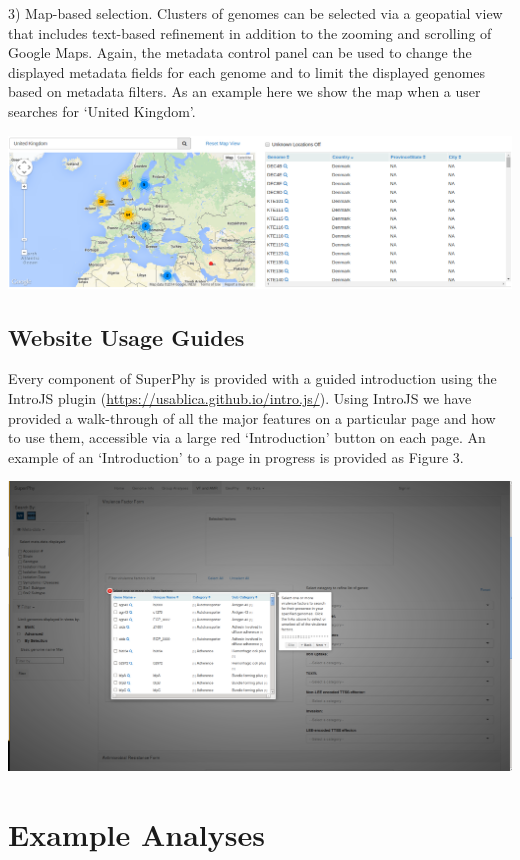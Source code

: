 \documentclass[doublespacing, linenumbers]{bmcart}
\begin{document}
 3) Map-based selection. Clusters of genomes can be selected via a geopatial view that includes text-based refinement in addition to the zooming and scrolling of Google Maps. Again, the metadata control panel can be used to change the displayed metadata fields for each genome and to limit the displayed genomes based on metadata filters. As an example here we show the map when a user searches for `United Kingdom'.

 \includegraphics[width=\textwidth]{images/uk-map.png}

\subsection{Website Usage Guides}
Every component of SuperPhy is provided with a guided introduction using the IntroJS plugin (\url{https://usablica.github.io/intro.js/}). Using IntroJS we have provided a walk-through of all the major features on a particular page and how to use them, accessible via a large red `Introduction' button on each page. An example of an `Introduction' to a page in progress is provided as Figure 3.

\includegraphics[width=\textwidth]{images/introjs_vfamr.png}

\section{Example Analyses}
\end{document}
